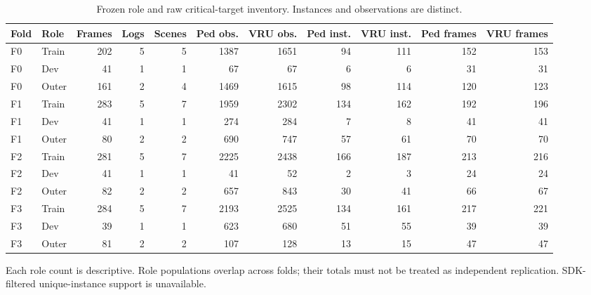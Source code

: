 \begin{table}[t]
\centering\footnotesize
\caption{Frozen role and raw critical-target inventory. Instances and observations are distinct.}\label{tab:inventory}
\setlength{\tabcolsep}{3pt}
\begin{tabular}{llrrrrrrrrr}\toprule
Fold & Role & Frames & Logs & Scenes & Ped obs. & VRU obs. & Ped inst. & VRU inst. & Ped frames & VRU frames\\\midrule
F0 & Train & 202 & 5 & 5 & 1387 & 1651 & 94 & 111 & 152 & 153\\
F0 & Dev & 41 & 1 & 1 & 67 & 67 & 6 & 6 & 31 & 31\\
F0 & Outer & 161 & 2 & 4 & 1469 & 1615 & 98 & 114 & 120 & 123\\
F1 & Train & 283 & 5 & 7 & 1959 & 2302 & 134 & 162 & 192 & 196\\
F1 & Dev & 41 & 1 & 1 & 274 & 284 & 7 & 8 & 41 & 41\\
F1 & Outer & 80 & 2 & 2 & 690 & 747 & 57 & 61 & 70 & 70\\
F2 & Train & 281 & 5 & 7 & 2225 & 2438 & 166 & 187 & 213 & 216\\
F2 & Dev & 41 & 1 & 1 & 41 & 52 & 2 & 3 & 24 & 24\\
F2 & Outer & 82 & 2 & 2 & 657 & 843 & 30 & 41 & 66 & 67\\
F3 & Train & 284 & 5 & 7 & 2193 & 2525 & 134 & 161 & 217 & 221\\
F3 & Dev & 39 & 1 & 1 & 623 & 680 & 51 & 55 & 39 & 39\\
F3 & Outer & 81 & 2 & 2 & 107 & 128 & 13 & 15 & 47 & 47\\
\bottomrule\end{tabular}
\par\vspace{3pt}\begin{minipage}{0.98\textwidth}\footnotesize Each role count is descriptive. Role populations overlap across folds; their totals must not be treated as independent replication. SDK-filtered unique-instance support is unavailable.\end{minipage}
\end{table}

